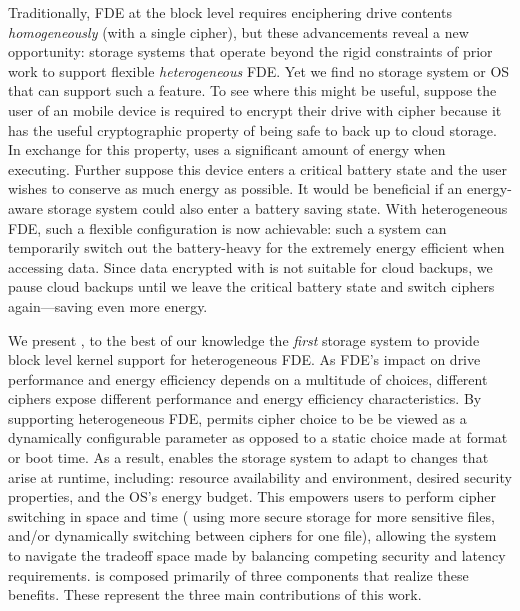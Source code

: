 Traditionally, FDE at the block level requires enciphering drive contents {\em
homogeneously} (with a single cipher), but these advancements reveal a new
opportunity: storage systems that operate beyond the rigid constraints of prior
work to support flexible {\em heterogeneous} FDE. Yet we find no storage system
or OS that can support such a feature. To see where this might be useful,
suppose the user of an mobile device is required to encrypt their drive with
cipher \encA because it has the useful cryptographic property of being safe to
back up to cloud storage. In exchange for this property, \encA uses a
significant amount of energy when executing. Further suppose this device enters
a critical battery state and the user wishes to conserve as much energy as
possible. It would be beneficial if an energy-aware storage system could also
enter a battery saving state. With heterogeneous FDE, such a flexible
configuration is now achievable: such a system can temporarily switch out the
battery-heavy \encA for the extremely energy efficient \encB when accessing
data. Since data encrypted with \encB is not suitable for cloud backups, we
pause cloud backups until we leave the critical battery state and switch ciphers
again---saving even more energy.


We present \sys, to the best of our knowledge the {\em first} storage
system to provide block level kernel support for heterogeneous FDE. As
FDE's impact on drive performance and energy efficiency depends on a
multitude of choices, different ciphers expose different performance
and energy efficiency characteristics. By supporting heterogeneous
FDE, \sys permits cipher choice to be be viewed as a dynamically
configurable parameter as opposed to a static choice made at format or
boot time. As a result, \sys enables the storage system to adapt to
changes that arise at runtime, including: resource availability and
environment, desired security properties, and the OS's energy budget.
This empowers users to perform cipher switching in space and time (\eg
using more secure storage for more sensitive files, and/or
dynamically switching between ciphers for one file), allowing the
system to navigate the tradeoff space made by balancing competing
security and latency requirements.  \sys is composed primarily of
three components that realize these benefits. These represent the
three main contributions of this work.

